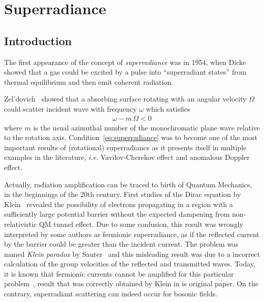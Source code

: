 
\chapter{Superradiance} %
\label{Chapter1} 


\section{Introduction}

The first appearance of the concept of \emph{superradiance} was in 1954, when Dicke~\cite{Dicke1954} showed that a gas could be excited by a pulse into ``superradiant states'' from thermal equilibrium and then emit coherent radiation.

Zel'dovich~\cite{Zeldovich1971,Zeldovich1972} showed that a absorbing surface rotating with an angular velocity $\Omega$ could scatter incident wave with frequency $\omega$ which satisfies
\begin{align}
    \omega - m\, \Omega < 0
    \label{eq:superradiance}
\end{align}
where $m$ is the usual azimuthal number of the monochromatic plane wave relative to the rotation axis. 
Condition~\eqref{eq:superradiance} was to become one of the most important results of (rotational) superradiance as it presents itself in multiple examples in the literature, \emph{i.e.} Vavilov-Cherekov effect and anomalous Doppler effect.

Actually, radiation amplification can be traced to birth of Quantum Mechanics, in the beginnings of the 20th century. 
First studies of the Dirac equation by Klein~\cite{Klein1929} revealed the possibility of electrons propagating in a region with a sufficiently large potential barrier without the expected dampening from non-relativistic QM tunnel effect.
Due to some confusion, this result was wrongly interpreted by some authors as fermionic superradiance, as if the reflected current by the barrier could be greater than the incident current. 
The problem was named \emph{Klein paradox} by Sauter~\cite{Sauter1931} and this misleading result was due to a incorrect calculation of the group velocities of the reflected and transmitted waves. 
Today, it is known that fermionic currents cannot be amplified for this particular problem~\cite{Manogue1988}, result that was correctly obtained by Klein in is original paper. 
On the contrary, superradiant scattering can indeed occur for bosonic fields.

